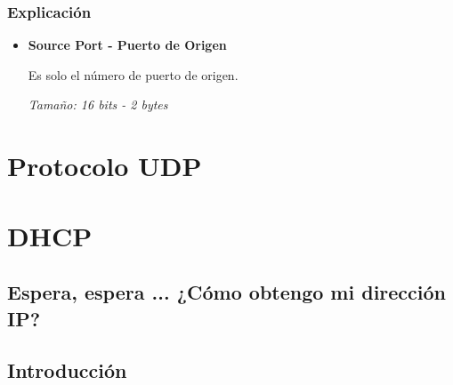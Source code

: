 \documentclass[12pt, fleqn]{report}                             %
\theoremstyle{break}                                            %
\begin{document}
            \clearpage
            \subsection{Explicación}


                \begin{itemize}
                    \item \textbf{Source Port - Puerto de Origen}

                        Es solo el número de puerto de origen.

                        \emph{Tamaño: 16 bits - 2 bytes}


                \end{itemize}




    \clearpage
    \chapter{Protocolo UDP}





    \chapter{DHCP}
    \section*{Espera, espera ... ¿Cómo obtengo mi dirección IP?}


        \clearpage
        \section{Introducción}
\end{document}
